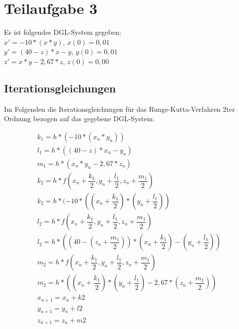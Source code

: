 \documentclass[]{scrartcl}
\begin{document}
\section{Teilaufgabe 3}
Es ist folgendes DGL-System gegeben: \\
$x' = -10 * (x*y)$, $x(0) = 0,01$ \\
$y' = (40 - z) * x - y$, $y(0) = 0,01$ \\
$z' = x * y - 2,67 * z$, $z(0) = 0,00$ \\


\subsection{Iterationsgleichungen}
Im Folgenden die Iterationsgleichungen für das Runge-Kutta-Verfahren 2ter Ordnung bezogen auf das gegebene DGL-System.

\begin{align}
k_{1} = h * (-10 * (x_{n} * y_{n})) \\
l_{1} = h * ((40 - z) * x_{n} - y_{n}) \\
m_{1} = h * (x_{n} * y_{n} - 2,67 * z_{n}) \\
k_{2} = h*f(x_{n} + \dfrac{k_{1} }{2},y_{n} + \dfrac{l_{1} }{2},z_{n} + \dfrac{m_{1} }{2}) \\
k_{2} = h* (-10 * ((x_{n} + \dfrac{k_{1} }{2})*(y_{n} + \dfrac{l_{1} }{2})) \\
l_{2} = h*f(x_{n} + \dfrac{k_{1} }{2},y_{n} + \dfrac{l_{1} }{2},z_{n} + \dfrac{m_{1} }{2}) \\
l_{2} = h*((40 - (z_{n} + \dfrac{m_{1} }{2})) * (x_{n} + \dfrac{k_{1} }{2}) - (y_{n} + \dfrac{l_{1} }{2})) \\
m_{2} = h*f(x_{n} + \dfrac{k_{1} }{2},y_{n} + \dfrac{l_{1} }{2},z_{n} + \dfrac{m_{1} }{2}) \\
m_{2} = h*((x_{n} + \dfrac{k_{1} }{2}) * (y_{n} + \dfrac{l_{1} }{2}) - 2,67 * (z_{n} + \dfrac{m_{1} }{2})) \\
x_{n+1} = x_{n} + k2 \\
y_{n+1} = y_{n} + l2 \\
z_{n+1} = z_{n} + m2
\end{align}
\end{document}
